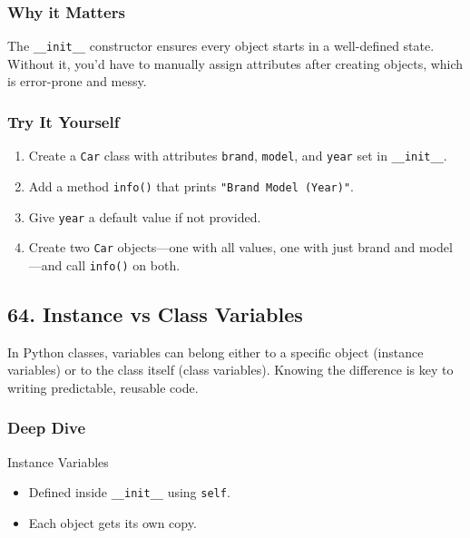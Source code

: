 \documentclass[
  letterpaper,
  DIV=11,
  numbers=noendperiod]{scrreprt}
\providecommand{\tightlist}{%
  \setlength{\itemsep}{0pt}\setlength{\parskip}{0pt}}
\begin{document}
\subsubsection{Why it Matters}\label{why-it-matters-62}

The \texttt{\_\_init\_\_} constructor ensures every object starts in a
well-defined state. Without it, you'd have to manually assign attributes
after creating objects, which is error-prone and messy.

\subsubsection{Try It Yourself}\label{try-it-yourself-62}

\begin{enumerate}
\def\labelenumi{\arabic{enumi}.}
\tightlist
\item
  Create a \texttt{Car} class with attributes \texttt{brand},
  \texttt{model}, and \texttt{year} set in \texttt{\_\_init\_\_}.
\item
  Add a method \texttt{info()} that prints
  \texttt{"Brand\ Model\ (Year)"}.
\item
  Give \texttt{year} a default value if not provided.
\item
  Create two \texttt{Car} objects---one with all values, one with just
  brand and model---and call \texttt{info()} on both.
\end{enumerate}

\subsection{64. Instance vs Class
Variables}\label{instance-vs-class-variables}

In Python classes, variables can belong either to a specific object
(instance variables) or to the class itself (class variables). Knowing
the difference is key to writing predictable, reusable code.

\subsubsection{Deep Dive}\label{deep-dive-63}

Instance Variables

\begin{itemize}
\tightlist
\item
  Defined inside \texttt{\_\_init\_\_} using \texttt{self}.
\item
  Each object gets its own copy.
\end{itemize}
\end{document}
